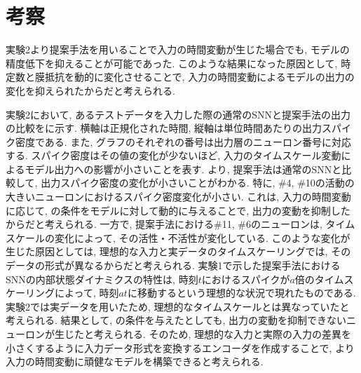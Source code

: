 \section{考察}


実験2より提案手法を用いることで入力の時間変動が生じた場合でも, モデルの精度低下を抑えることが可能であった.
このような結果になった原因として, 時定数と膜抵抗を動的に変化させることで, 入力の時間変動によるモデルの出力の変化を抑えられたからだと考えられる.

実験2において, あるテストデータを入力した際の通常のSNNと提案手法の出力の比較をに示す.
横軸は正規化された時間, 縦軸は単位時間あたりの出力スパイク密度である.
また, グラフのそれぞれの番号は出力層のニューロン番号に対応する.
スパイク密度はその値の変化が少ないほど, 入力のタイムスケール変動によるモデル出力への影響が小さいことを表す.
より, 提案手法は通常のSNNと比較して, 出力スパイク密度の変化が小さいことがわかる.
特に, \#4, \#10の活動の大きいニューロンにおけるスパイク密度変化が小さい.
これは, 入力の時間変動に応じて, の条件をモデルに対して動的に与えることで, 出力の変動を抑制したからだと考えられる.
一方で, 提案手法における\#11, \#6のニューロンは, タイムスケールの変化によって, その活性・不活性が変化している.
このような変化が生じた原因としては, 理想的な入力と実データのタイムスケーリングでは, そのデータの形式が異なるからだと考えられる.
実験1で示した提案手法におけるSNNの内部状態ダイナミクスの特性は, 時刻$t$におけるスパイクが$a$倍のタイムスケーリングによって, 時刻$at$に移動するという理想的な状況で現れたものである.
実験2では実データを用いたため, 理想的なタイムスケールとは異なっていたと考えられる.
結果として, の条件を与えたとしても, 出力の変動を抑制できないニューロンが生じたと考えられる.
そのため, 理想的な入力と実際の入力の差異を小さくするように入力データ形式を変換するエンコーダを作成することで, より入力の時間変動に頑健なモデルを構築できると考えられる.

% 
% 
% 